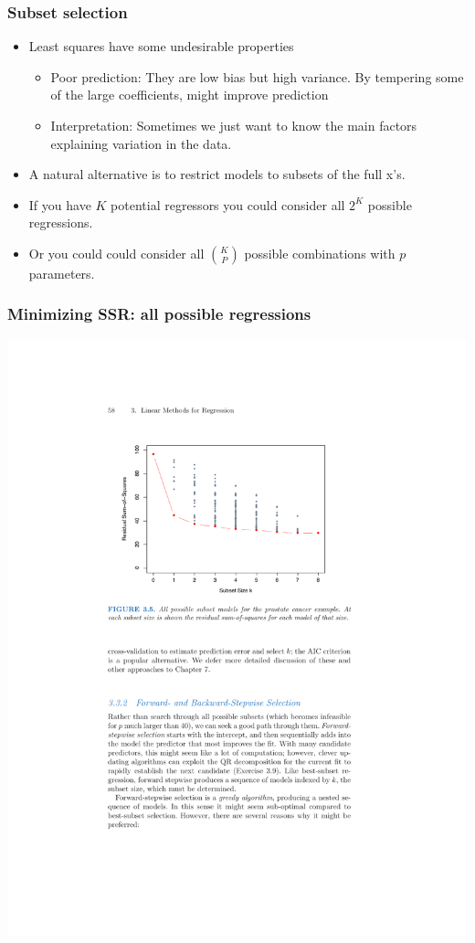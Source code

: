 \begin{frame}
    \frametitle{Subset selection}
    \begin{itemize}
    \item Least squares have some undesirable properties
    \begin{itemize}
        \item Poor prediction: They are low bias but high variance. By tempering some of the large coefficients, might improve prediction
        \item Interpretation: Sometimes we just want to know the main factors explaining variation in the data. 
    \end{itemize} 
    \item A natural alternative is to restrict models to subsets of the full x's. 
    \item If you have $K$ potential regressors you could consider all $2^K$ possible regressions.
    \item Or you could could consider all $K \choose P$ possible combinations with $p$ parameters.
    \end{itemize}
\end{frame}

\begin{frame}
\frametitle{Minimizing SSR: all possible regressions}
\vspace{-10pt}
\begin{center}
\includegraphics[scale = 0.75]{./resources/subsetsaic}
\end{center}
\end{frame}


